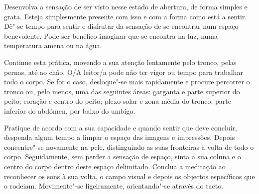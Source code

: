 Desenvolva a sensação de ser visto nesse estado de abertura, de forma simples e
grata. Esteja simplesmente presente com isso e com a forma como está a sentir.
Dê"-se tempo para sentir e disfrutar da sensação de se encontrar num espaço
benevolente. Pode ser benéfico imaginar que se encontra na luz, numa temperatura
amena ou na água.

Continue esta prática, movendo a sua atenção lentamente pelo tronco, pelas
pernas, até ao chão. O/A leitor/a pode não ter vigor ou tempo para trabalhar
todo o corpo. Se for o caso, desloque"-se mais rapidamente e procure percorrer o
tronco ou, pelo menos, uma das seguintes áreas: garganta e parte superior do
peito; coração e centro do peito; plexo solar e zona média do tronco; parte
inferior do abdómen, por baixo do umbigo.

Pratique de acordo com a sua capacidade e quando sentir que deve concluir,
despenda algum tempo a limpar o espaço das imagens e impressões. Depois
concentre"-se novamente na pele, distinguindo as suas fronteiras à volta de todo
o corpo. Seguidamente, sem perder a sensação de espaço, sinta a sua coluna e o
centro do corpo dentro deste espaço delimitado. Conclua a meditação ao
reconhecer os sons à sua volta, o campo visual e depois os objectos específicos
que o rodeiam. Movimente"-se ligeiramente, orientando"-se através do tacto.
